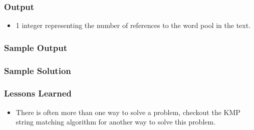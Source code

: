 \subsubsection{Output}
\begin{itemize}
	\item 1 integer representing the number of references to the word pool in the text.
\end{itemize}

\subsubsection{Sample Output}


\subsubsection{Sample Solution}


\subsubsection{Lessons Learned}
\begin{itemize}
	\item There is often more than one way to solve a problem,  checkout the KMP string matching algorithm for another way to solve this problem.
\end{itemize}
